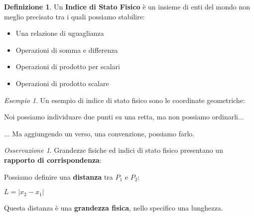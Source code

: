 \documentclass[a4paper, 12pt]{report}
\theoremstyle{definition}
\newtheorem{definition}{Definizione}[section]
\theoremstyle{remark}
\newtheorem*{example}{Esempio}
\newtheorem*{remark}{Osservazione}
\theoremstyle{plain}
\begin{document}
\begin{definition}
    Un {\bf Indice di Stato Fisico} è un insieme di enti del mondo non meglio precisato tra i quali possiamo stabilire:
    \begin{itemize}
        \item Una relazione di uguaglianza
        \item Operazioni di somma e differenza
        \item Operazioni di prodotto per scalari
        \item Operazioni di prodotto scalare
    \end{itemize}
\end{definition}

\begin{example}
    Un esempio di indice di stato fisico sono le coordinate geometriche:
    \begin{center}
    \end{center}
    Noi possiamo individuare due punti su una retta, ma non possiamo ordinarli...
    \begin{center}
    \end{center}
    ... Ma aggiungendo un verso, una convenzione, possiamo farlo.
\end{example}

\begin{remark}
    Grandezze fisiche ed indici di stato fisico presentano un {\bf rapporto di corrispondenza}:
    \begin{center}
    \end{center}
    Possiamo definire una {\bf distanza} tra $P_1$ e $P_2$:
    \begin{center}
        $L = |x_2 - x_1|$\\
    \end{center}
    Questa distanza è una {\bf grandezza fisica}, nello specifico una lunghezza.
\end{remark}
\end{document}
